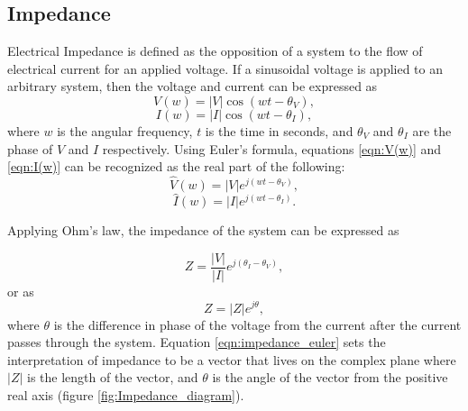  \subsection*{Impedance}
 \par Electrical Impedance is defined as the opposition of a system to the flow of electrical current for an applied voltage. If a sinusoidal voltage is applied to an arbitrary system, then the voltage and current can be expressed as
 \begin{equation}
    V(w) = |V|\cos(wt-\theta_V),
    \label{eqn:V(w)}
 \end{equation}
 \begin{equation}
    I(w) = |I|\cos(wt - \theta_I),
    \label{eqn:I(w)}
 \end{equation}
 \noindent where $w$ is the angular frequency, $t$ is the time in seconds, and $\theta_V$ and $\theta_I$ are the phase of $V$ and $I$ respectively. Using Euler's formula, equations \ref{eqn:V(w)} and \ref{eqn:I(w)} can be recognized as the real part of the following:
 \begin{equation}
    \hat{V}(w) = |V|e^{j(wt-\theta_V)},
 \end{equation}
 \begin{equation}
     \hat{I}(w) = |I|e^{j(wt-\theta_I)}.
 \end{equation}
 
 \noindent Applying Ohm's law, the impedance of the system can be expressed as
 
 \begin{equation}
    Z = \frac{|V|}{|I|}e^{j(\theta_I-\theta_V)},
 \end{equation}
 \noindent or as 
 \begin{equation}
     Z = |Z|e^{j\theta},
     \label{eqn:impedance_euler}
 \end{equation}
 \noindent where $\theta$ is the difference in phase of the voltage from the current after the current passes through the system. Equation \ref{eqn:impedance_euler} sets the interpretation of impedance to be a vector that lives on the complex plane where $|Z|$ is the length of the vector, and $\theta$ is the angle of the vector from the positive real axis (figure \ref{fig:Impedance_diagram}).
 

